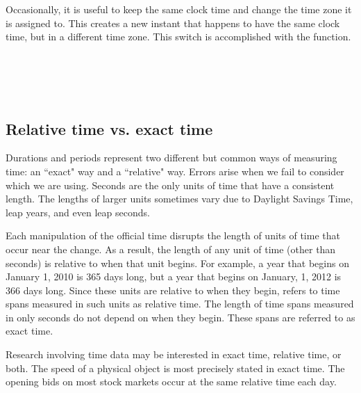 \documentclass[article]{jss}
\begin{document}
Occasionally, it is useful to keep the same clock time and change the time zone it is assigned to. This creates a new instant that happens to have the same clock time, but in a different time zone. This switch is accomplished with the  function.\\

\\
\\
\\
\\


\subsection{Relative time vs. exact time}

Durations and periods represent two different but common ways of measuring time: an ``exact" way and a ``relative" way.  Errors arise when we fail to consider which we are using.  Seconds are the only units of time that have a consistent length. The lengths of larger units sometimes vary due to Daylight Savings Time, leap years, and even leap seconds. 


Each manipulation of the official time disrupts the length of units of time that occur near the change. As a result, the length of any unit of time (other than seconds) is relative to when that unit begins. For example, a year that begins on January 1, 2010 is 365 days long, but a year that begins on January, 1, 2012 is 366 days long. Since these units are relative to when they begin,  refers to time spans measured in such units as relative time. The length of time spans measured in only seconds do not depend on when they begin. These spans are referred to as exact time.

Research involving time data may be interested in exact time, relative time, or both. The speed of a physical object is most precisely stated in exact time. The opening bids on most stock markets occur at the same relative time each day.  
\end{document}
